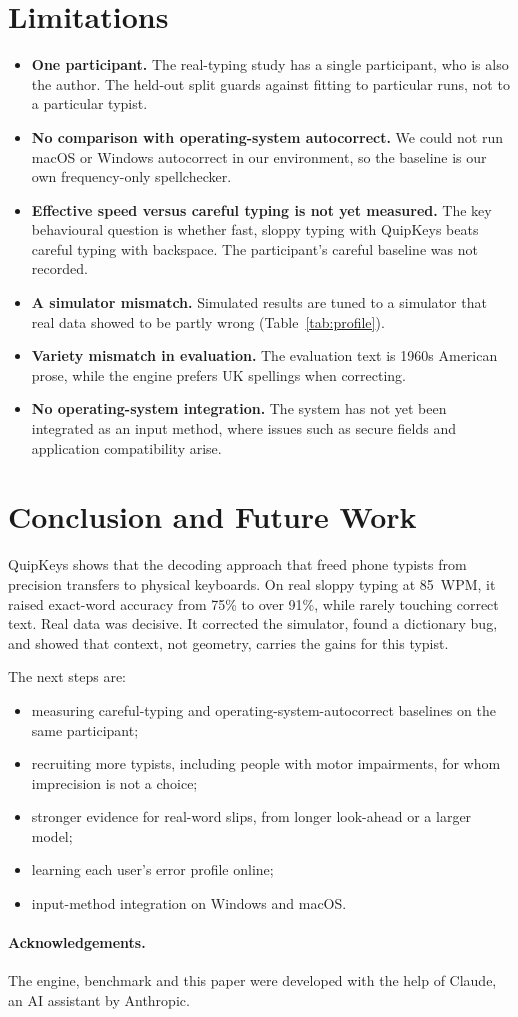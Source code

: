 \documentclass[11pt,a4paper]{article}
\newcommand{\qk}{QuipKeys}
\begin{document}
\section{Limitations}
\label{sec:limits}
\begin{itemize}
\item \textbf{One participant.} The real-typing study has a single participant, who is also the author. The held-out split guards against fitting to particular runs, not to a particular typist.
\item \textbf{No comparison with operating-system autocorrect.} We could not run macOS or Windows autocorrect in our environment, so the baseline is our own frequency-only spellchecker.
\item \textbf{Effective speed versus careful typing is not yet measured.} The key behavioural question is whether fast, sloppy typing with \qk{} beats careful typing with backspace. The participant's careful baseline was not recorded.
\item \textbf{A simulator mismatch.} Simulated results are tuned to a simulator that real data showed to be partly wrong (Table~\ref{tab:profile}).
\item \textbf{Variety mismatch in evaluation.} The evaluation text is 1960s American prose, while the engine prefers UK spellings when correcting.
\item \textbf{No operating-system integration.} The system has not yet been integrated as an input method, where issues such as secure fields and application compatibility arise.
\end{itemize}

\section{Conclusion and Future Work}
\qk{} shows that the decoding approach that freed phone typists from precision transfers to physical keyboards. On real sloppy typing at 85~WPM, it raised exact-word accuracy from 75\% to over 91\%, while rarely touching correct text. Real data was decisive. It corrected the simulator, found a dictionary bug, and showed that context, not geometry, carries the gains for this typist.

The next steps are:
\begin{itemize}
\item measuring careful-typing and operating-system-autocorrect baselines on the same participant;
\item recruiting more typists, including people with motor impairments, for whom imprecision is not a choice;
\item stronger evidence for real-word slips, from longer look-ahead or a larger model;
\item learning each user's error profile online;
\item input-method integration on Windows and macOS.
\end{itemize}

\paragraph{Acknowledgements.} The engine, benchmark and this paper were developed with the help of Claude, an AI assistant by Anthropic.



\end{document}
